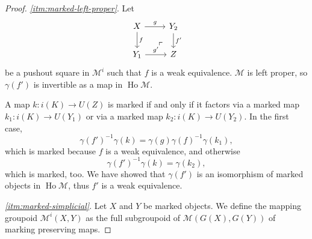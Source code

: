 \documentclass[a4paper]{article}
\theoremstyle{remark}
\theoremstyle{definition}
\begin{document}
\begin{proof}
  \emph{\ref{itm:marked-left-proper}}.
  Let 
  \begin{equation}
    \begin{tikzcd}
      X \arrow[r, "g"] \arrow[d, "f"] \arrow[dr, phantom, near end, "\ulcorner"] & Y_2 \arrow[d, "f'"] \\
      Y_1 \arrow[r, "g'"] & Z
    \end{tikzcd}
  \end{equation}
  be a pushout square in $\mathcal{M}^i$ such that $f$ is a weak equivalence.
  $\mathcal{M}$ is left proper, so $\gamma(f')$ is invertible as a map in $\operatorname{Ho} \mathcal{M}$.

  A map $k : i(K) \rightarrow U(Z)$ is marked if and only if it factors via a marked map $k_1 : i(K) \rightarrow U(Y_1)$ or via a marked map $k_2 : i(K) \rightarrow U(Y_2)$.
  In the first case,
  \begin{equation}
    \gamma(f')^{-1} \gamma(k) = \gamma(g) \gamma(f)^{-1} \gamma(k_1),
  \end{equation}
  which is marked because $f$ is a weak equivalence, and otherwise
  \begin{equation}
    \gamma(f')^{-1} \gamma(k) = \gamma(k_2),
  \end{equation}
  which is marked, too.
  We have showed that $\gamma(f')$ is an isomorphism of marked objects in $\operatorname{Ho} \mathcal{M}$, thus $f'$ is a weak equivalence.

  \emph{\ref{itm:marked-simplicial}}.
  Let $X$ and $Y$ be marked objects.
  We define the mapping groupoid $\mathcal{M}^i(X, Y)$ as the full subgroupoid of $\mathcal{M}(G(X), G(Y))$ of marking preserving maps.


\end{proof}
\end{document}
